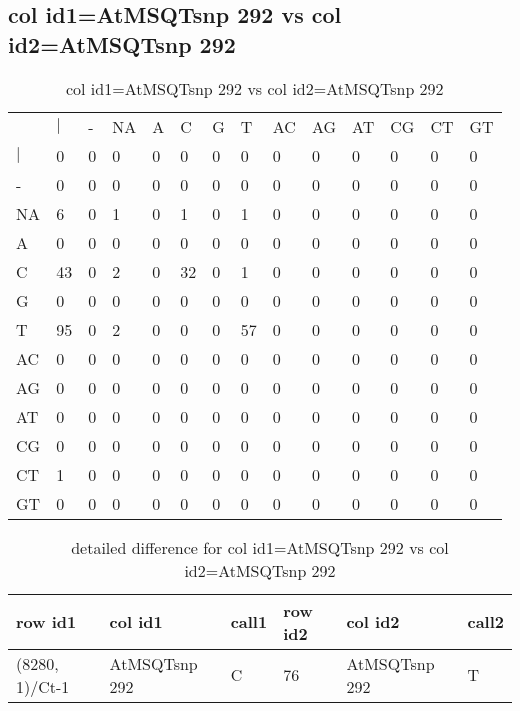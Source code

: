 \subsection{col id1=AtMSQTsnp 292 vs col id2=AtMSQTsnp 292}
\begin{center}
\begin{longtable}{|l|l|l|l|l|l|l|l|l|l|l|l|l|l|}
\caption{col id1=AtMSQTsnp 292 vs col id2=AtMSQTsnp 292} \label{table_dm632}\\
\hline
\\
\hline
&$|$&-&NA&A&C&G&T&AC&AG&AT&CG&CT&GT\\
$|$&0&0&0&0&0&0&0&0&0&0&0&0&0\\
-&0&0&0&0&0&0&0&0&0&0&0&0&0\\
NA&6&0&1&0&1&0&1&0&0&0&0&0&0\\
A&0&0&0&0&0&0&0&0&0&0&0&0&0\\
C&43&0&2&0&32&0&1&0&0&0&0&0&0\\
G&0&0&0&0&0&0&0&0&0&0&0&0&0\\
T&95&0&2&0&0&0&57&0&0&0&0&0&0\\
AC&0&0&0&0&0&0&0&0&0&0&0&0&0\\
AG&0&0&0&0&0&0&0&0&0&0&0&0&0\\
AT&0&0&0&0&0&0&0&0&0&0&0&0&0\\
CG&0&0&0&0&0&0&0&0&0&0&0&0&0\\
CT&1&0&0&0&0&0&0&0&0&0&0&0&0\\
GT&0&0&0&0&0&0&0&0&0&0&0&0&0\\
\hline
\end{longtable}
\end{center}

\begin{center}
\begin{longtable}{|l|l|l|l|l|l|}
\caption{detailed difference for col id1=AtMSQTsnp 292 vs col id2=AtMSQTsnp 292} \label{table_dm633}\\
\hline
row id1&col id1&call1&row id2&col id2&call2\\
\hline
(8280, 1)/Ct-1&AtMSQTsnp 292&C&76&AtMSQTsnp 292&T\\
\hline
\end{longtable}
\end{center}

